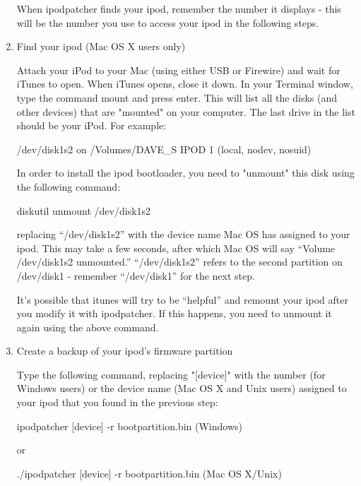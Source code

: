 \begin{enumerate}
    When ipodpatcher finds your ipod, remember the number it displays - this 
    will  be the number you use to access your ipod in the following steps.


  \item Find your ipod (Mac OS X users only)

    Attach your iPod to your Mac (using either USB or Firewire) and wait for 
    iTunes to open. When iTunes opens, close it down.  In your Terminal window, 
    type the command mount and press enter. This will list all the disks (and 
    other devices) that are "mounted" on your computer. The last  drive in the 
    list should be your iPod. For example: 
    \begin{code}
       /dev/disk1s2 on /Volumes/DAVE_S IPOD 1 (local, nodev, nosuid) 
    \end{code}

    In order to install the ipod bootloader, you need to "unmount" this disk 
    using the following command: 
      \begin{code} 
        diskutil unmount /dev/disk1s2 
      \end{code}
      
    replacing ``/dev/disk1s2'' with the device name Mac OS has assigned to your
    ipod. This may take a few seconds, after which Mac OS will say ``Volume 
    /dev/disk1s2 unmounted.'' ``/dev/disk1s2'' refers to the second partition on 
    /dev/disk1 - remember   ``/dev/disk1'' for the next step.

    It's possible that itunes will try to be ``helpful'' and remount your ipod 
    after you modify it with ipodpatcher. If this happens, you need to unmount 
    it again using the above command. 
  
  \item Create a backup of your ipod's firmware partition

    Type the following command, replacing "[device]" with the number (for 
    Windows users) or the device name (Mac OS X and Unix users) assigned to 
    your ipod that  you found in the previous step: 
      \begin{code} 
        ipodpatcher [device] -r bootpartition.bin (Windows) 
      \end{code}
      or
      \begin{code}
        ./ipodpatcher [device] -r bootpartition.bin (Mac OS X/Unix)
      \end{code}
  

\end{enumerate}
